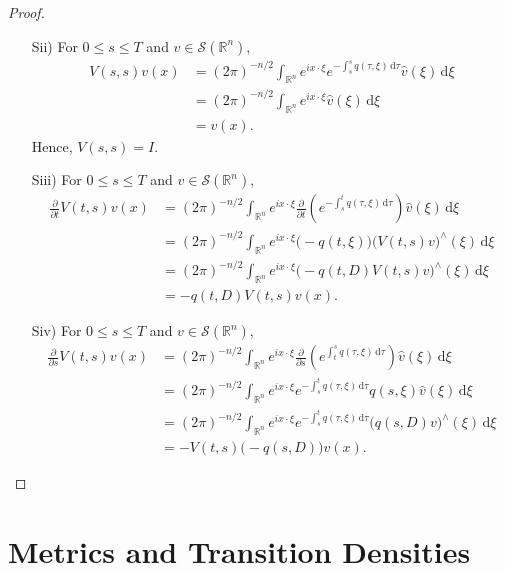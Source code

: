 \documentclass[a4paper, 12pt]{report}
\theoremstyle{remark}
\theoremstyle{definition}
\begin{document}
\begin{proof}
\begin{itemize}
\item[Sii)] For $0 \le s \le T$ and $v \in \mathcal{S}(\mathbb{R}^n)$,
\begin{align}
V(s, s)v(x) & = (2\pi)^{-n/2}\int_{\mathbb{R}^n}e^{ix\cdot\xi}e^{-\int_s^sq(\tau, \xi)\,\mathrm{d}\tau}\hat{v}(\xi)\,\mathrm{d}\xi\nonumber\\
& = (2\pi)^{-n/2}\int_{\mathbb{R}^n}e^{ix\cdot\xi}\hat{v}(\xi)\,\mathrm{d}\xi\nonumber\\
& = v(x).\nonumber
\end{align}
Hence, $V(s, s) = I$.

\item[Siii)] For $0 \le s \le T$ and $v \in \mathcal{S}(\mathbb{R}^n)$,
\begin{align}
\frac{\partial}{\partial t}V(t, s)v(x) & = (2\pi)^{-n/2}\int_{\mathbb{R}^n}e^{ix\cdot\xi}\frac{\partial}{\partial t}\left(e^{-\int_s^tq(\tau, \xi)\,\mathrm{d}\tau}\right)\hat{v}(\xi)\,\mathrm{d}\xi\nonumber\\
& = (2\pi)^{-n/2}\int_{\mathbb{R}^n}e^{ix\cdot\xi}\big(-q(t, \xi)\big)\big(V(t, s)v\big)^\wedge(\xi)\,\mathrm{d}\xi\nonumber\\
& = (2\pi)^{-n/2}\int_{\mathbb{R}^n}e^{ix\cdot\xi}\big(-q(t, D)V(t, s)v\big)^\wedge(\xi)\,\mathrm{d}\xi\nonumber\\
& = -q(t, D)V(t, s)v(x)\nonumber.
\end{align}

\item[Siv)] For $0 \le s \le T$ and $v \in \mathcal{S}(\mathbb{R}^n)$,
\begin{align}
\frac{\partial}{\partial s}V(t, s)v(x) & = (2\pi)^{-n/2}\int_{\mathbb{R}^n}e^{ix\cdot\xi}\frac{\partial}{\partial s}\left(e^{\int_t^sq(\tau, \xi)\,\mathrm{d}\tau}\right)\hat{v}(\xi)\,\mathrm{d}\xi\nonumber\\
& = (2\pi)^{-n/2}\int_{\mathbb{R}^n}e^{ix\cdot\xi}e^{-\int_s^tq(\tau, \xi)\,\mathrm{d}\tau}q(s, \xi)\hat{v}(\xi)\,\mathrm{d}\xi\nonumber\\
& = (2\pi)^{-n/2}\int_{\mathbb{R}^n}e^{ix\cdot\xi}e^{-\int_s^tq(\tau, \xi)\,\mathrm{d}\tau}\big(q(s, D)v\big)^\wedge(\xi)\,\mathrm{d}\xi\nonumber\\
& = -V(t, s)\big(-q(s, D)\big)v(x)\nonumber.
\end{align}

\end{itemize}
\end{proof}

\newpage

\section{Metrics and Transition Densities}\label{Se.MaTD}
\end{document}
